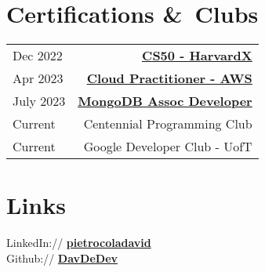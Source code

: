 \documentclass[]{DavidPietrocola-resume}
\begin{document}
\begin{minipage}[t]{0.37\textwidth}
\section{Certifications \&\ Clubs}
\begin{tabular}{lr}
Dec 2022&  \textbf{\underline{\href{https://certificates.cs50.io/5c64e9de-6da5-43d2-8e2d-f888535489b7.pdf?size=letter}{CS50 - HarvardX}}}  \\
 Apr 2023& \textbf{\underline{\href{https://www.credly.com/badges/94d2934f-5383-4e1c-a55e-47515c806f7f/linked_in_profile}{Cloud Practitioner - AWS}}}\\
 July 2023& \textbf{\underline{\href{https://www.credly.com/badges/21d50060-794b-4d25-b926-20b19de12ebe/linked_in_profile}{MongoDB Assoc Developer}}}\\
Current & Centennial Programming Club\\
Current & Google Developer Club - UofT

\end{tabular}
\sectionsep
\section{Links}
LinkedIn://  \href{https://www.linkedin.com/in/pietrocoladavid/}{\bf pietrocoladavid} \\
Github:// \href{https://github.com/DavDeDev}{\bf DavDeDev} \\



%
%

\end{minipage} 
\hfill
\end{document}
